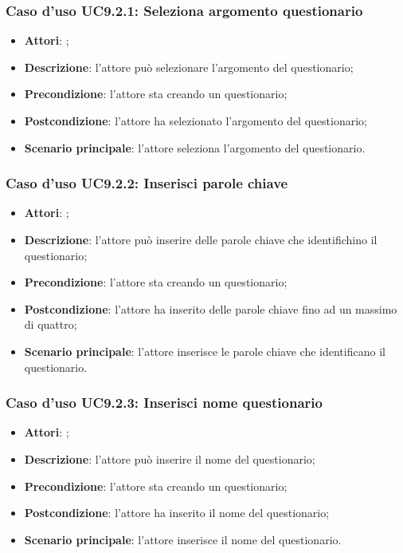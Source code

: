 		\subsubsection{Caso d'uso UC9.2.1: Seleziona argomento questionario}
		\label{UC9.2.1}
		\begin{itemize}
			\item \textbf{Attori}: \uaupro{};
			\item \textbf{Descrizione}: l'attore può selezionare l'argomento del questionario; 
			\item \textbf{Precondizione}: l'attore sta creando un questionario;
			\item \textbf{Postcondizione}: l'attore ha selezionato l'argomento del questionario;
			\item \textbf{Scenario principale}: l'attore seleziona l'argomento del questionario.
		\end{itemize}
		
		\subsubsection{Caso d'uso UC9.2.2: Inserisci parole chiave}
		\label{UC9.2.2}
		\begin{itemize}
			\item \textbf{Attori}: \uaupro{};
			\item \textbf{Descrizione}: l'attore può inserire delle parole chiave che identifichino il questionario; 
			\item \textbf{Precondizione}: l'attore sta creando un questionario;
			\item \textbf{Postcondizione}: l'attore ha inserito delle parole chiave fino ad un massimo di quattro; 
			\item \textbf{Scenario principale}: l'attore inserisce le parole chiave che identificano il questionario.
		\end{itemize}
			
		\subsubsection{Caso d'uso UC9.2.3: Inserisci nome questionario}
		\label{UC9.2.3}
		\begin{itemize}
			\item \textbf{Attori}: \uaupro{};
			\item \textbf{Descrizione}: l'attore può inserire il nome del questionario; 
			\item \textbf{Precondizione}: l'attore sta creando un questionario;
			\item \textbf{Postcondizione}: l'attore ha inserito il nome del questionario; 
			\item \textbf{Scenario principale}: l'attore inserisce il nome del questionario.
		\end{itemize}
				
